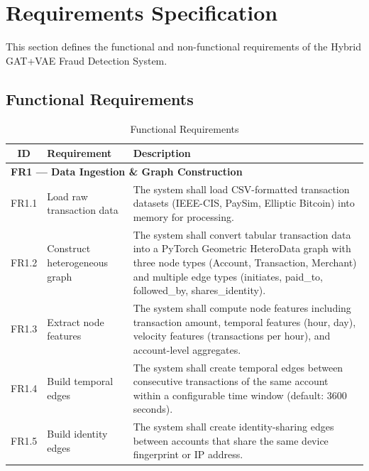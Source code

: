 \section{Requirements Specification}

This section defines the functional and non-functional requirements of the Hybrid GAT+VAE Fraud Detection System.

\subsection{Functional Requirements}

\begin{table}[h!]
\centering
\caption{Functional Requirements}
\label{tab:functional-requirements}
\begin{tabular}{|c|p{4cm}|p{8cm}|}
\hline
\textbf{ID} & \textbf{Requirement} & \textbf{Description} \\
\hline

\multicolumn{3}{|l|}{\textbf{FR1 — Data Ingestion \& Graph Construction}} \\
\hline
FR1.1 & Load raw transaction data & The system shall load CSV-formatted transaction datasets (IEEE-CIS, PaySim, Elliptic Bitcoin) into memory for processing. \\
\hline
FR1.2 & Construct heterogeneous graph & The system shall convert tabular transaction data into a PyTorch Geometric HeteroData graph with three node types (Account, Transaction, Merchant) and multiple edge types (initiates, paid\_to, followed\_by, shares\_identity). \\
\hline
FR1.3 & Extract node features & The system shall compute node features including transaction amount, temporal features (hour, day), velocity features (transactions per hour), and account-level aggregates. \\
\hline
FR1.4 & Build temporal edges & The system shall create temporal edges between consecutive transactions of the same account within a configurable time window (default: 3600 seconds). \\
\hline
FR1.5 & Build identity edges & The system shall create identity-sharing edges between accounts that share the same device fingerprint or IP address. \\
\hline


\end{tabular}
\end{table}
